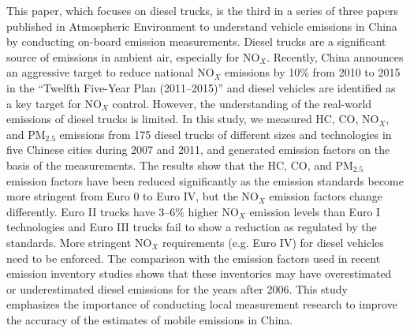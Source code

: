 This paper, which focuses on diesel trucks, is the third in a series of three papers published in Atmospheric Environment to understand vehicle emissions in China by conducting on-board emission measurements. Diesel trucks are a significant source of emissions in ambient air, especially for NO$_X$. Recently, China announces an aggressive target to reduce national NO$_X$ emissions by 10\% from 2010 to 2015 in the “Twelfth Five-Year Plan (2011–2015)” and diesel vehicles are identified as a key target for NO$_X$ control. However, the understanding of the real-world emissions of diesel trucks is limited. In this study, we measured HC, CO, NO$_X$, and PM$_{2.5}$ emissions from 175 diesel trucks of different sizes and technologies in five Chinese cities during 2007 and 2011, and generated emission factors on the basis of the measurements. The results show that the HC, CO, and PM$_{2.5}$ emission factors have been reduced significantly as the emission standards become more stringent from Euro 0 to Euro IV, but the NO$_X$ emission factors change differently. Euro II trucks have 3–6\% higher NO$_X$ emission levels than Euro I technologies and Euro III trucks fail to show a reduction as regulated by the standards. More stringent NO$_X$ requirements (e.g. Euro IV) for diesel vehicles need to be enforced. The comparison with the emission factors used in recent emission inventory studies shows that these inventories may have overestimated or underestimated diesel emissions for the years after 2006. This study emphasizes the importance of conducting local measurement research to improve the accuracy of the estimates of mobile emissions in China.
